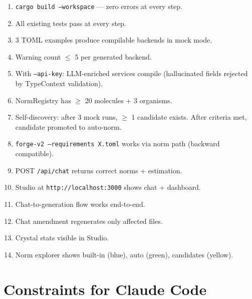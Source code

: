\documentclass[11pt,a4paper]{article}
\begin{document}
\begin{enumerate}
\item \texttt{cargo build --workspace} --- zero errors at every step.
\item All existing tests pass at every step.
\item 3 TOML examples produce compilable backends in mock mode.
\item Warning count $\leq$ 5 per generated backend.
\item With \texttt{--api-key}: LLM-enriched services compile
  (hallucinated fields rejected by TypeContext validation).
\item NormRegistry has $\geq$ 20 molecules + 3 organisms.
\item Self-discovery: after 3 mock runs, $\geq$ 1 candidate exists.
  After criteria met, candidate promoted to auto-norm.
\item \texttt{forge-v2 --requirements X.toml} works via norm path
  (backward compatible).
\item POST \texttt{/api/chat} returns correct norms + estimation.
\item Studio at \texttt{http://localhost:3000} shows chat + dashboard.
\item Chat-to-generation flow works end-to-end.
\item Chat amendment regenerates only affected files.
\item Crystal stats visible in Studio.
\item Norm explorer shows built-in (blue), auto (green), candidates (yellow).
\end{enumerate}

\section{Constraints for Claude Code}
\end{document}
